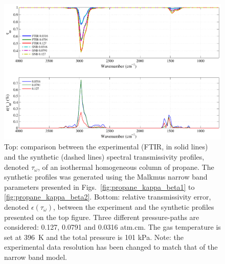 \begin{figure}[p]
\includegraphics[width=\textwidth]{Figures/Comparison_Fit_Propane_MALKMUS_Temp396K.pdf}
\caption{Top: comparison between the experimental (FTIR, in solid lines) and the synthetic (dashed lines) spectral transmissivity profiles, denoted $\tau_{\omega}$, of an isothermal homogeneous column of propane. The synthetic profiles was generated using the Malkmus narrow band parameters presented in Figs.~\ref{fig:propane_kappa_beta1} to \ref{fig:propane_kappa_beta2}. Bottom: relative transmissivity error, denoted $\epsilon{(\tau_{\omega})}$, between the experiment and the synthetic profiles presented on the top figure. Three different pressure-paths are considered: 0.127, 0.0791 and 0.0316 atm.cm. The gas temperature is set at 396~K and the total pressure is 101 kPa. Note: the experimental data resolution has been changed to match that of the narrow band model. \label{fig:propane_SNBVerify_396K}}
\end{figure}

